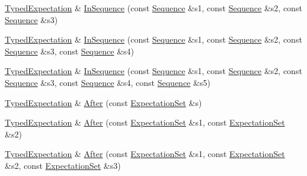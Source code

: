 \begin{DoxyCompactItemize}
\item 
\hyperlink{classtesting_1_1internal_1_1_typed_expectation}{Typed\+Expectation} \& \hyperlink{classtesting_1_1internal_1_1_typed_expectation_a17cfbb9db111e0ded254759664e78d73}{In\+Sequence} (const \hyperlink{classtesting_1_1_sequence}{Sequence} \&s1, const \hyperlink{classtesting_1_1_sequence}{Sequence} \&s2, const \hyperlink{classtesting_1_1_sequence}{Sequence} \&s3)
\item 
\hyperlink{classtesting_1_1internal_1_1_typed_expectation}{Typed\+Expectation} \& \hyperlink{classtesting_1_1internal_1_1_typed_expectation_aa60bae1cf536651dc5efcd8110bea4fd}{In\+Sequence} (const \hyperlink{classtesting_1_1_sequence}{Sequence} \&s1, const \hyperlink{classtesting_1_1_sequence}{Sequence} \&s2, const \hyperlink{classtesting_1_1_sequence}{Sequence} \&s3, const \hyperlink{classtesting_1_1_sequence}{Sequence} \&s4)
\item 
\hyperlink{classtesting_1_1internal_1_1_typed_expectation}{Typed\+Expectation} \& \hyperlink{classtesting_1_1internal_1_1_typed_expectation_ad8775f8ba9965d1836f6e4c09baf1c3e}{In\+Sequence} (const \hyperlink{classtesting_1_1_sequence}{Sequence} \&s1, const \hyperlink{classtesting_1_1_sequence}{Sequence} \&s2, const \hyperlink{classtesting_1_1_sequence}{Sequence} \&s3, const \hyperlink{classtesting_1_1_sequence}{Sequence} \&s4, const \hyperlink{classtesting_1_1_sequence}{Sequence} \&s5)
\item 
\hyperlink{classtesting_1_1internal_1_1_typed_expectation}{Typed\+Expectation} \& \hyperlink{classtesting_1_1internal_1_1_typed_expectation_a30f320d18ebf1a40e94883d7a56c6c8c}{After} (const \hyperlink{classtesting_1_1_expectation_set}{Expectation\+Set} \&s)
\item 
\hyperlink{classtesting_1_1internal_1_1_typed_expectation}{Typed\+Expectation} \& \hyperlink{classtesting_1_1internal_1_1_typed_expectation_a8e272fc396e508a2e63b13be30f81f15}{After} (const \hyperlink{classtesting_1_1_expectation_set}{Expectation\+Set} \&s1, const \hyperlink{classtesting_1_1_expectation_set}{Expectation\+Set} \&s2)
\item 
\hyperlink{classtesting_1_1internal_1_1_typed_expectation}{Typed\+Expectation} \& \hyperlink{classtesting_1_1internal_1_1_typed_expectation_a95a341dd221901b5e51dd7cfdbdb3570}{After} (const \hyperlink{classtesting_1_1_expectation_set}{Expectation\+Set} \&s1, const \hyperlink{classtesting_1_1_expectation_set}{Expectation\+Set} \&s2, const \hyperlink{classtesting_1_1_expectation_set}{Expectation\+Set} \&s3)
\item 

\end{DoxyCompactItemize}
